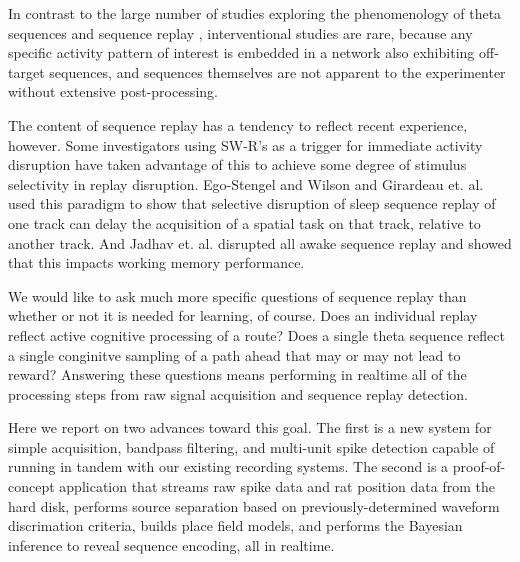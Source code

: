 \documentclass[10pt]{article}
\begin{document}
In contrast to the large number of studies exploring the phenomenology of theta sequences and sequence replay \cite{davidson2009hippocampal,gupta2012segmentation,karlsson2009awake,pfeiffer2013hippocampal,cei2014hippocampal}, interventional studies are rare, because any specific activity pattern of interest is embedded in a network also exhibiting off-target sequences, and sequences themselves are not apparent to the experimenter without extensive post-processing. 

The content of sequence replay has a tendency to reflect recent experience, however. Some investigators using SW-R's as a trigger for immediate activity disruption have taken advantage of this to achieve some degree of stimulus selectivity in replay disruption. Ego-Stengel and Wilson \cite{ego2010disruption} and Girardeau et. al. \cite{girardeau2009selective} used this paradigm to show that selective disruption of sleep sequence replay of one track can delay the acquisition of a spatial task on that track, relative to another track. And Jadhav et. al. \cite{jadhav2012awake} disrupted all awake sequence replay and showed that this impacts working memory performance.

We would like to ask much more specific questions of sequence replay than whether or not it is needed for learning, of course. Does an individual replay reflect active cognitive processing of a route? Does a single theta sequence reflect a single conginitve sampling of a path ahead that may or may not lead to reward? Answering these questions means performing in realtime all of the processing steps from raw signal acquisition and sequence replay detection.

Here we report on two advances toward this goal. The first is a new system for simple acquisition, bandpass filtering, and multi-unit spike detection capable of running in tandem with our existing recording systems. The second is a proof-of-concept application that streams raw spike data and rat position data from the hard disk, performs source separation based on previously-determined waveform discrimation criteria, builds place field models, and performs the Bayesian inference to reveal sequence encoding, all in realtime.
\end{document}
